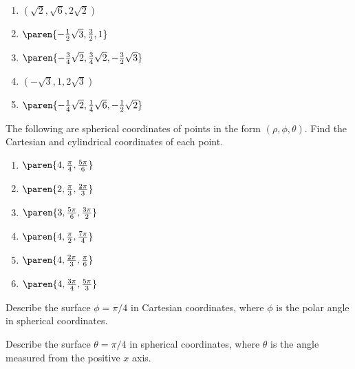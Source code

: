 \begin{enumialphparenastyle}
\begin{ex}
\begin{enumerate}
\item $(\sqrt{2},\sqrt{6},2\sqrt{2}) $

\item $\paren{-\frac{1}{2}\sqrt{3},\frac{3}{2},1} $

\item $\paren{-\frac{3}{4}\sqrt{2},\frac{3}{4}\sqrt{2},-\frac{3}{2}\sqrt{3}} $

\item $(-\sqrt{3},1,2\sqrt{3}) $

\item $\paren{-\frac{1}{4}\sqrt{2},\frac{1}{4}\sqrt{6},-\frac{1}{2}\sqrt{2}} $
\end{enumerate}
\end{ex}

\begin{ex}
The following are spherical coordinates of points in the form $(
\rho,\phi,\theta)$. Find the Cartesian and cylindrical
coordinates of each point.

\begin{enumerate}
\item $\paren{4,\frac{\pi }{4},\frac{5\pi }{6}} $

\item $\paren{2,\frac{\pi }{3},\frac{2\pi }{3}} $

\item $\paren{3,\frac{5\pi }{6},\frac{3\pi }{2}} $

\item $\paren{4,\frac{\pi }{2},\frac{7\pi }{4}} $

\item $\paren{4,\frac{2\pi }{3},\frac{\pi }{6}} $

\item $\paren{4,\frac{3\pi }{4},\frac{5\pi }{3}} $
\end{enumerate}
\end{ex}

\begin{ex} Describe the surface $\phi =\pi
/4$ in Cartesian coordinates, where $\phi $ is the polar angle in spherical coordinates.
\end{ex}

\begin{ex} Describe the surface $\theta =\pi /4$ in spherical coordinates, where $\theta $ is
the angle measured from the positive $x$ axis. 
\end{ex}


\end{enumialphparenastyle}
